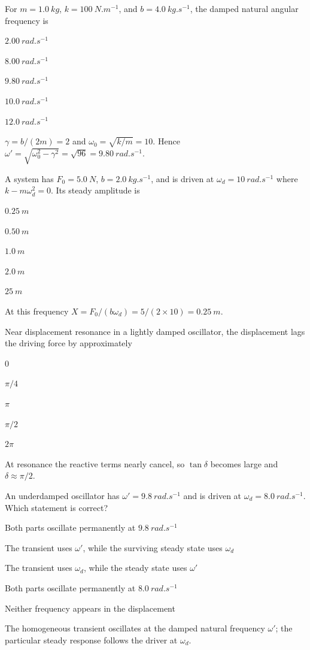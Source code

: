 \documentclass[10pt,a4paper,full]{physicsquiz}
\newcommand{\bankq}[9]{%
  \begin{quizquestion}[
    id=#1,
    topic={#2},
    difficulty=#3,
    marks=1,
    correct=#4,
    tags={#5},
    outcome={#6}
  ]
    #7
    \begin{choiceoptions}
      #8
    \end{choiceoptions}
  \end{quizquestion}
  \begin{quizsolution}
    #9
  \end{quizsolution}
}
\begin{document}
\begin{quizbank}
\bankq{damping-018}{Damping, Resonance, and Transients}{applied}{C}{damping,frequency,numerical}{Calculate the damped natural frequency.}{%
For \(m=\SI{1.0}{kg}\), \(k=\SI{100}{N.m^{-1}}\), and \(b=\SI{4.0}{kg.s^{-1}}\), the damped natural angular frequency is}{%
\item \(\SI{2.00}{rad.s^{-1}}\)
\item \(\SI{8.00}{rad.s^{-1}}\)
\item \(\SI{9.80}{rad.s^{-1}}\)
\item \(\SI{10.0}{rad.s^{-1}}\)
\item \(\SI{12.0}{rad.s^{-1}}\)}{%
\(\gamma=b/(2m)=2\) and \(\omega_0=\sqrt{k/m}=10\). Hence \(\omega'=\sqrt{\omega_0^2-\gamma^2}=\sqrt{96}=\SI{9.80}{rad.s^{-1}}\).}

\bankq{damping-019}{Damping, Resonance, and Transients}{applied}{A}{resonance,amplitude,numerical}{Evaluate the driven amplitude at resonance.}{%
A system has \(F_0=\SI{5.0}{N}\), \(b=\SI{2.0}{kg.s^{-1}}\), and is driven at \(\omega_d=\SI{10}{rad.s^{-1}}\) where \(k-m\omega_d^2=0\). Its steady amplitude is}{%
\item \(\SI{0.25}{m}\)
\item \(\SI{0.50}{m}\)
\item \(\SI{1.0}{m}\)
\item \(\SI{2.0}{m}\)
\item \(\SI{25}{m}\)}{%
At this frequency \(X=F_0/(b\omega_d)=5/(2\times10)=\SI{0.25}{m}\).}

\bankq{damping-020}{Damping, Resonance, and Transients}{applied}{D}{resonance,phase}{Interpret phase at resonance.}{%
Near displacement resonance in a lightly damped oscillator, the displacement lags the driving force by approximately}{%
\item \(0\)
\item \(\pi/4\)
\item \(\pi\)
\item \(\pi/2\)
\item \(2\pi\)}{%
At resonance the reactive terms nearly cancel, so \(\tan\delta\) becomes large and \(\delta\approx\pi/2\).}

\bankq{damping-021}{Damping, Resonance, and Transients}{applied}{B}{transient,steady-state,frequency}{Identify frequencies in the complete driven response.}{%
An underdamped oscillator has \(\omega'=\SI{9.8}{rad.s^{-1}}\) and is driven at \(\omega_d=\SI{8.0}{rad.s^{-1}}\). Which statement is correct?}{%
\item Both parts oscillate permanently at \(\SI{9.8}{rad.s^{-1}}\)
\item The transient uses \(\omega'\), while the surviving steady state uses \(\omega_d\)
\item The transient uses \(\omega_d\), while the steady state uses \(\omega'\)
\item Both parts oscillate permanently at \(\SI{8.0}{rad.s^{-1}}\)
\item Neither frequency appears in the displacement}{%
The homogeneous transient oscillates at the damped natural frequency \(\omega'\); the particular steady response follows the driver at \(\omega_d\).}


\end{quizbank}
\end{document}
